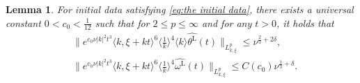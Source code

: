 \documentclass[reqno, 12pt]{amsart} %
\theoremstyle{plain} %
\newtheorem{Lem}[Thm]{Lemma}     %
\theoremstyle{definition}
\theoremstyle{remark}
\numberwithin{equation}{section} %
\begin{document}
	\begin{Lem} \label{lem:linear Linfty}
		For initial data satisfying \eqref{eq:the initial data}, there exists a universal constant $0< c_0 <\frac{1}{12}$ such that for $2\leq p \leq \infty$ and for any $t>0$, it holds that
		\begin{equation*}\begin{aligned}
				&\|e^{c_0 \nu |k|^2 t^3}  \langle k, \xi + kt \rangle^6\langle\frac{1}{k}\rangle^4 \langle k \rangle \widehat{\theta^{\mathrm{L}} } (t)\|_{L_{k,\xi}^p} \leq \nu^{\frac23 + 2\delta} , \\
				&\|e^{c_0 \nu |k|^2 t^3}  \langle k, \xi + kt \rangle^6\langle\frac{1}{k}\rangle^4 \widehat{\omega^{\mathrm{L}} } (t)\|_{L_{k,\xi}^p}\leq C(c_0) \nu^{\frac13 + \delta}.
		\end{aligned}\end{equation*}
	\end{Lem}
\end{document}
